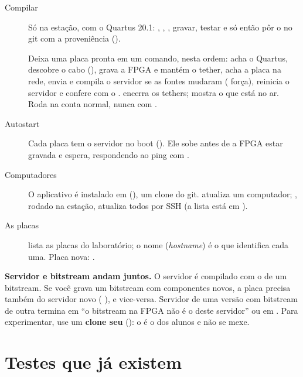 \documentclass[11pt,a4paper,oneside]{article}
\begin{document}
\begin{description}
  \item[Compilar] Só na estação, com o Quartus 20.1: ,
    , , gravar, testar e só então pôr o
     no git com a proveniência ().
  \item[] Deixa uma placa pronta em um comando, nesta
    ordem: acha o Quartus, descobre o cabo (), grava a FPGA e
    mantém o tether, acha a placa na rede, envia e compila o servidor se as
    fontes mudaram ( força), reinicia o servidor e confere com o
    .  encerra os tethers;  mostra o
    que está no ar. Roda na conta normal, nunca com .
  \item[Autostart] Cada placa tem o servidor no boot
    (). Ele sobe antes de a FPGA estar
    gravada e espera, respondendo ao ping com .
  \item[Computadores] O aplicativo é instalado em 
    (), um clone do git.  atualiza um
    computador; , rodado na estação, atualiza todos por
    SSH (a lista está em ).
  \item[As placas]  lista as placas do laboratório; o nome
    (\emph{hostname}) é o que identifica cada uma. Placa nova: .
\end{description}

\begin{cuidado}
\textbf{Servidor e bitstream andam juntos.} O servidor é compilado com o
 de um bitstream. Se você grava um bitstream com componentes
novos, a placa precisa também do servidor novo (
), e vice-versa. Servidor de uma versão com bitstream de outra
termina em ``o bitstream na FPGA não é o deste servidor'' ou em
. Para experimentar, use um \textbf{clone seu}
(): o  é o dos alunos e não se mexe.
\end{cuidado}

\section{Testes que já existem}
\end{document}
